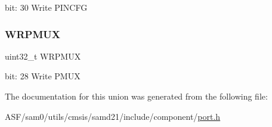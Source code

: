 bit\+: 30 Write P\+I\+N\+C\+FG \mbox{\label{union_p_o_r_t___w_r_c_o_n_f_i_g___type_add0323fb7417989d39b1c4b3663432e3}} 
\subsubsection{\texorpdfstring{WRPMUX}{WRPMUX}}
{\footnotesize\ttfamily uint32\+\_\+t W\+R\+P\+M\+UX}

bit\+: 28 Write P\+M\+UX 

The documentation for this union was generated from the following file\+:\begin{DoxyCompactItemize}
\item 
A\+S\+F/sam0/utils/cmsis/samd21/include/component/\mbox{\hyperlink{utils_2cmsis_2samd21_2include_2component_2port_8h}{port.\+h}}\end{DoxyCompactItemize}

